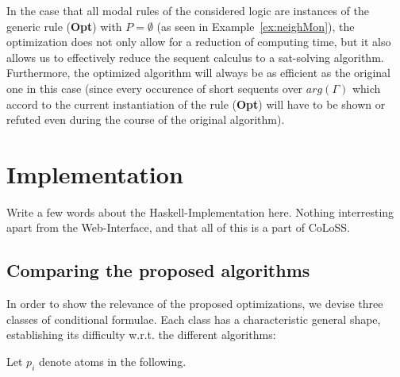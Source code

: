 \documentclass{entcs} \usepackage{entcsmacro}
\begin{document}
\begin{remark}
In the case that all modal rules of the considered logic are instances of
the generic rule (\textbf{Opt}) with $P=\emptyset$ (as seen in Example~\ref{ex:neighMon}),
the optimization does not only allow for a reduction of computing time, but
it also allows us to effectively reduce the sequent calculus to a sat-solving
algorithm.
Furthermore, the optimized algorithm will always be as efficient as the
original one in this case (since every occurence of short sequents over $arg(\Gamma)$ 
which accord to the current instantiation of the rule (\textbf{Opt}) will
have to be shown or refuted even during the course of the original algorithm).
\end{remark}

\section{Implementation}

Write a few words about the Haskell-Implementation here. Nothing interresting apart
from the Web-Interface, and that all of this is a part of CoLoSS.

\subsection{Comparing the proposed algorithms}

In order to show the relevance of the proposed optimizations, we devise three classes
of conditional formulae. Each class has a characteristic general shape, establishing its
difficulty w.r.t. the different algorithms:

Let $p_i$ denote atoms in the following.
\end{document}
